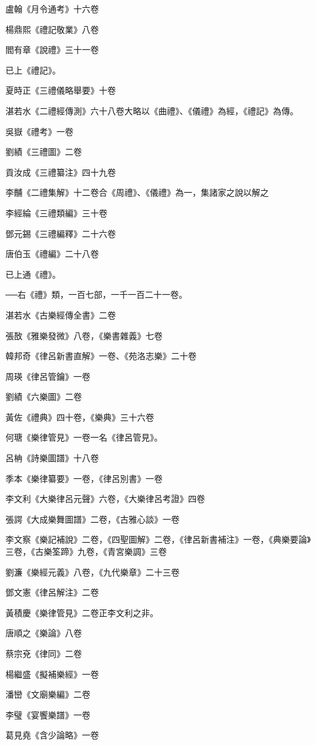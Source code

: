 盧翰《月令通考》十六卷

楊鼎熙《禮記敬業》八卷

閻有章《說禮》三十一卷

已上《禮記》。

夏時正《三禮儀略舉要》十卷

湛若水《二禮經傳測》六十八卷大略以《曲禮》、《儀禮》為經，《禮記》為傳。

吳嶽《禮考》一卷

劉績《三禮圖》二卷

貢汝成《三禮纂注》四十九卷

李黼《二禮集解》十二卷合《周禮》、《儀禮》為一，集諸家之說以解之

李經綸《三禮類編》三十卷

鄧元錫《三禮編釋》二十六卷

唐伯玉《禮編》二十八卷

已上通《禮》。

──右《禮》類，一百七部，一千一百二十一卷。

湛若水《古樂經傳全書》二卷

張敔《雅樂發微》八卷，《樂書雜義》七卷

韓邦奇《律呂新書直解》一卷、《苑洛志樂》二十卷

周瑛《律呂管鑰》一卷

劉績《六樂圖》二卷

黃佐《禮典》四十卷，《樂典》三十六卷

何瑭《樂律管見》一卷一名《律呂管見》。

呂柟《詩樂圖譜》十八卷

季本《樂律纂要》一卷，《律呂別書》一卷

李文利《大樂律呂元聲》六卷，《大樂律呂考證》四卷

張諤《大成樂舞圖譜》二卷，《古雅心談》一卷

李文察《樂記補說》二卷，《四聖圖解》二卷，《律呂新書補注》一卷，《典樂要論》三卷，《古樂筌蹄》九卷，《青宮樂調》三卷

劉濂《樂經元義》八卷，《九代樂章》二十三卷

鄧文憲《律呂解注》二卷

黃積慶《樂律管見》二卷正李文利之非。

唐順之《樂論》八卷

蔡宗兗《律同》二卷

楊繼盛《擬補樂經》一卷

潘巒《文廟樂編》二卷

李璧《宴饗樂譜》一卷

葛見堯《含少論略》一卷

